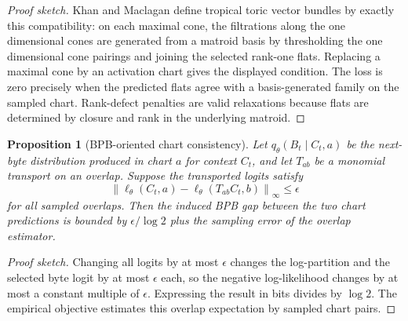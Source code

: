 \documentclass[11pt]{article}
\newtheorem{proposition}[definition]{Proposition}
\newcommand{\norm}[1]{\left\lVert #1\right\rVert}
\begin{document}
\begin{proof}[Proof sketch]
Khan and Maclagan define tropical toric vector bundles by exactly this compatibility: on each maximal cone, the filtrations along the one dimensional cones are generated from a matroid basis by thresholding the one dimensional cone pairings and joining the selected rank-one flats.  Replacing a maximal cone by an activation chart gives the displayed condition.  The loss is zero precisely when the predicted flats agree with a basis-generated family on the sampled chart.  Rank-defect penalties are valid relaxations because flats are determined by closure and rank in the underlying matroid.\end{proof}

\begin{proposition}[BPB-oriented chart consistency]
Let $q_{\theta}(B_t\mid C_t,a)$ be the next-byte distribution produced in chart $a$ for context $C_t$, and let $T_{ab}$ be a monomial transport on an overlap.  Suppose the transported logits satisfy
\[
  \norm{\ell_{\theta}(C_t,a)-\ell_{\theta}(T_{ab}C_t,b)}_{\infty}\le \epsilon
\]
for all sampled overlaps.  Then the induced BPB gap between the two chart predictions is bounded by $\epsilon/\log 2$ plus the sampling error of the overlap estimator.
\end{proposition}

\begin{proof}[Proof sketch]
Changing all logits by at most $\epsilon$ changes the log-partition and the selected byte logit by at most $\epsilon$ each, so the negative log-likelihood changes by at most a constant multiple of $\epsilon$.  Expressing the result in bits divides by $\log 2$.  The empirical objective estimates this overlap expectation by sampled chart pairs.\end{proof}
\end{document}
